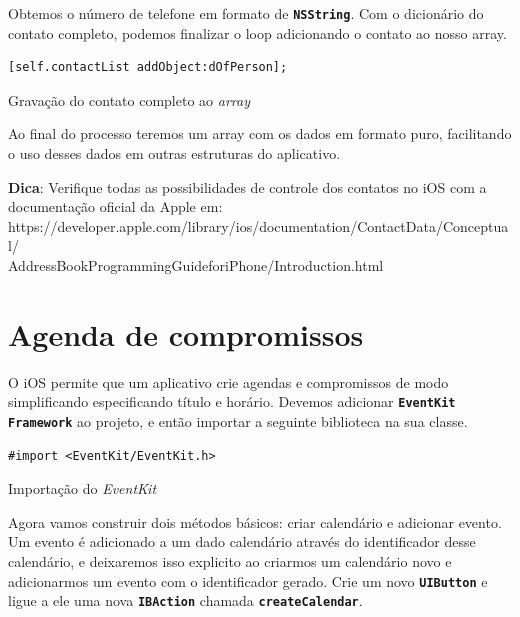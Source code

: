 \documentclass[a4paper,12pt,brazil,doubleside]{book}
\begin{document}
\begin{singlespace}
Obtemos o número de telefone em formato de \texttt{\textbf{NSString}}. Com o dicionário do contato completo, podemos finalizar o loop adicionando o contato ao nosso array.

\begin{listing}[H]
\begin{verbatim}
[self.contactList addObject:dOfPerson];
\end{verbatim}
\caption{Gravação do contato completo ao \emph{array}}
\end{listing}


Ao final do processo teremos um array com os dados em formato puro, facilitando o uso desses dados em outras estruturas do aplicativo.

\bigskip

\begin{framed}

\textbf{Dica}: Verifique todas as possibilidades de controle dos contatos no iOS com a documentação oficial da Apple em:\\ https://developer.apple.com/library/ios/documentation/ContactData/Conceptual/\\AddressBookProgrammingGuideforiPhone/Introduction.html
\end{framed}

\section{Agenda de compromissos}


O iOS permite que um aplicativo crie agendas e compromissos de modo simplificando especificando título e horário. Devemos adicionar \texttt{\textbf{EventKit Framework}} ao projeto, e então importar a seguinte biblioteca na sua classe.

\begin{listing}[H]
\begin{verbatim}
#import <EventKit/EventKit.h>
\end{verbatim}
\caption{Importação do \emph{EventKit}}
\end{listing}


Agora vamos construir dois métodos básicos: criar calendário e adicionar evento. Um evento é adicionado a um dado calendário através do identificador desse calendário, e deixaremos isso explicito ao criarmos um calendário novo e adicionarmos um evento com o identificador gerado. Crie um novo \texttt{\textbf{UIButton}} e ligue a ele uma nova \texttt{\textbf{IBAction}} chamada \texttt{\textbf{createCalendar}}.


\end{singlespace}
\end{document}
